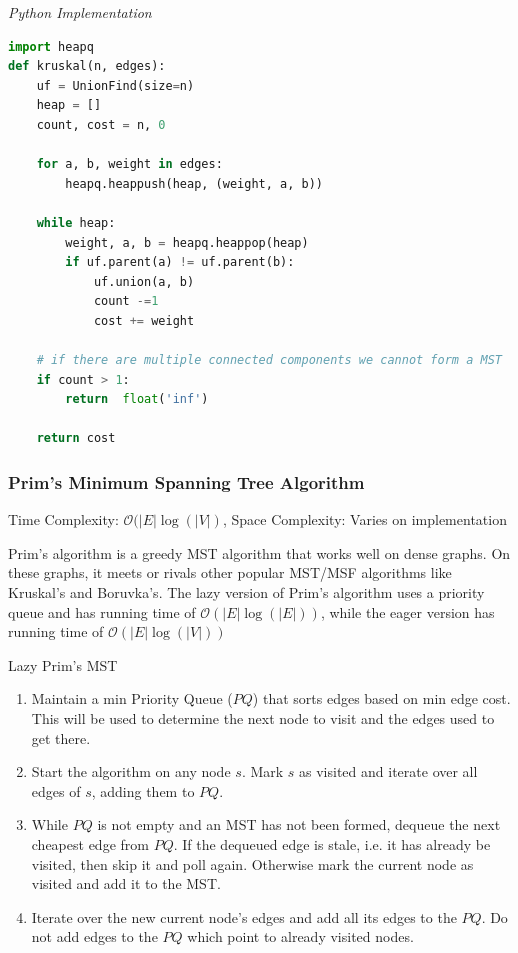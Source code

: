 \documentclass{article}
\newcommand{\bigO}{\mathcal{O}}
\begin{document}
\vspace{8pt} \emph{Python Implementation}
\begin{lstlisting}[language=Python]
import heapq
def kruskal(n, edges):
    uf = UnionFind(size=n)
    heap = []
    count, cost = n, 0
    
    for a, b, weight in edges:
        heapq.heappush(heap, (weight, a, b))
        
    while heap:
        weight, a, b = heapq.heappop(heap)
        if uf.parent(a) != uf.parent(b):
            uf.union(a, b)
            count -=1
            cost += weight
            
    # if there are multiple connected components we cannot form a MST
    if count > 1:
        return  float('inf')
    
    return cost
\end{lstlisting}
    
    \subsubsection{Prim's Minimum Spanning Tree Algorithm}
    Time Complexity:  $\bigO(|E|\log(|V|)$, Space Complexity: Varies on implementation
    
    Prim's algorithm is a greedy MST algorithm that works well on dense graphs. On these graphs, it meets or rivals other popular MST/MSF algorithms like Kruskal's and Boruvka's. The lazy version of Prim's algorithm uses a priority queue and has running time of $\bigO(|E| \log(|E|))$, while the eager version has running time of $\bigO(|E| \log(|V|))$ 
    
    Lazy Prim's MST
    \begin{enumerate}
        \item Maintain a min Priority Queue ($PQ$) that sorts edges based on min edge cost. This will be used to determine the next node to visit and the edges used to get there.
        
        \item Start the algorithm on any node $s$. Mark $s$ as visited and iterate over all edges of $s$, adding them to $PQ$.
        
        \item While $PQ$ is not empty and an MST has not been formed, dequeue the next cheapest edge from $PQ$. If the dequeued edge is stale, i.e. it has already be visited, then skip it and poll again. Otherwise mark the current node as visited and add it to the MST.
        
        \item Iterate over the new current node's edges and add all its edges to the $PQ$. Do not add edges to the $PQ$ which point to already visited nodes.
    \end{enumerate}
    
\end{document}
